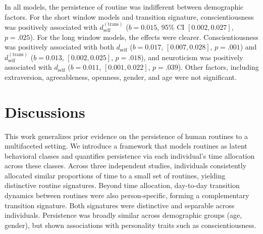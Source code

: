 \documentclass[pdflatex,sn-vancouver,Numbered]{bst/sn-jnl}%
\theoremstyle{thmstyleone}%
\theoremstyle{thmstyletwo}%
\theoremstyle{thmstylethree}%
\begin{document}




 In all models, the persistence of routine was indifferent between demographic factors. For the short window models and transition signature, conscientiousness was positively associated with \(d_{\text{self}}^{(\text{trans})}\) (\(b=0.015\), 95\% CI \([0.002, 0.027]\), \(p=.025\)). For the long window models, the effects were clearer. Conscientiousness was positively associated with both \(d_{\text{self}}\) (\(b=0.017\), \([0.007, 0.028]\), \(p=.001\)) and \(d_{\text{self}}^{(\text{trans})}\) (\(b=0.013\), \([0.002, 0.025]\), \(p=.018\)), and neuroticism was positively associated with \(d_{\text{self}}\) (\(b=0.011\), \([0.001, 0.022]\), \(p=.039\)). Other factors, including extraversion, agreeableness, openness, gender, and age were not significant.

\section*{Discussions}\label{sec4}  

This work generalizes prior evidence on the persistence of human routines to a multifaceted setting. We introduce a framework that models routines as latent behavioral classes and quantifies persistence via each individual’s time allocation across these classes. Across three independent studies, individuals consistently allocated similar proportions of time to a small set of routines, yielding distinctive routine signatures. Beyond time allocation, day-to-day transition dynamics between routines were also person-specific, forming a complementary transition signature. Both signatures were distinctive and separable across individuals. Persistence was broadly similar across demographic groups (age, gender), but shown associations with personality traits such as conscientiousness.
\end{document}

